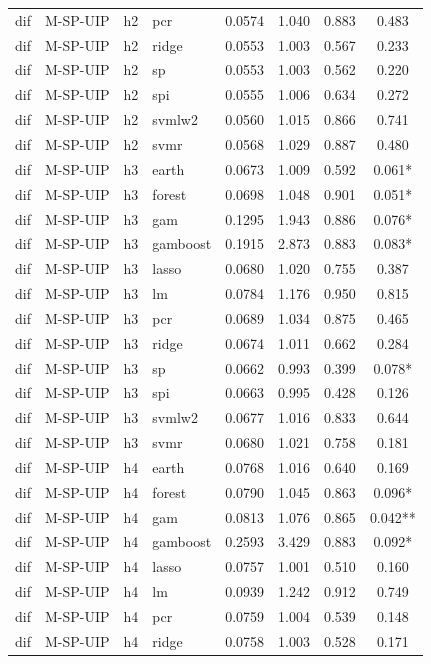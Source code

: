\begin{ThreePartTable}
\begin{longtable}[t]{llclcccc}
dif & M-SP-UIP & h2 & pcr & 0.0574 & 1.040 & 0.883 & 0.483\\
dif & M-SP-UIP & h2 & ridge & 0.0553 & 1.003 & 0.567 & 0.233\\
dif & M-SP-UIP & h2 & sp & 0.0553 & 1.003 & 0.562 & 0.220\\
dif & M-SP-UIP & h2 & spi & 0.0555 & 1.006 & 0.634 & 0.272\\
dif & M-SP-UIP & h2 & svmlw2 & 0.0560 & 1.015 & 0.866 & 0.741\\
dif & M-SP-UIP & h2 & svmr & 0.0568 & 1.029 & 0.887 & 0.480\\
\addlinespace
dif & M-SP-UIP & h3 & earth & 0.0673 & 1.009 & 0.592 & 0.061*\\
dif & M-SP-UIP & h3 & forest & 0.0698 & 1.048 & 0.901 & 0.051*\\
dif & M-SP-UIP & h3 & gam & 0.1295 & 1.943 & 0.886 & 0.076*\\
dif & M-SP-UIP & h3 & gamboost & 0.1915 & 2.873 & 0.883 & 0.083*\\
dif & M-SP-UIP & h3 & lasso & 0.0680 & 1.020 & 0.755 & 0.387\\
dif & M-SP-UIP & h3 & lm & 0.0784 & 1.176 & 0.950 & 0.815\\
dif & M-SP-UIP & h3 & pcr & 0.0689 & 1.034 & 0.875 & 0.465\\
dif & M-SP-UIP & h3 & ridge & 0.0674 & 1.011 & 0.662 & 0.284\\
dif & M-SP-UIP & h3 & sp & 0.0662 & 0.993 & 0.399 & 0.078*\\
dif & M-SP-UIP & h3 & spi & 0.0663 & 0.995 & 0.428 & 0.126\\
dif & M-SP-UIP & h3 & svmlw2 & 0.0677 & 1.016 & 0.833 & 0.644\\
dif & M-SP-UIP & h3 & svmr & 0.0680 & 1.021 & 0.758 & 0.181\\
\addlinespace
dif & M-SP-UIP & h4 & earth & 0.0768 & 1.016 & 0.640 & 0.169\\
dif & M-SP-UIP & h4 & forest & 0.0790 & 1.045 & 0.863 & 0.096*\\
dif & M-SP-UIP & h4 & gam & 0.0813 & 1.076 & 0.865 & 0.042**\\
dif & M-SP-UIP & h4 & gamboost & 0.2593 & 3.429 & 0.883 & 0.092*\\
dif & M-SP-UIP & h4 & lasso & 0.0757 & 1.001 & 0.510 & 0.160\\
dif & M-SP-UIP & h4 & lm & 0.0939 & 1.242 & 0.912 & 0.749\\
dif & M-SP-UIP & h4 & pcr & 0.0759 & 1.004 & 0.539 & 0.148\\
dif & M-SP-UIP & h4 & ridge & 0.0758 & 1.003 & 0.528 & 0.171\\

\end{longtable}
\end{ThreePartTable}
